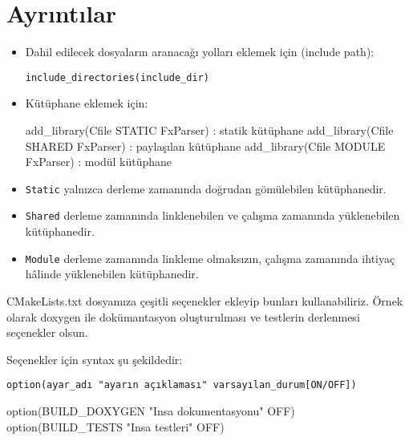 \documentclass[
]{book}
\newenvironment{Shaded}{\begin{snugshade}}{\end{snugshade}}
\newcommand{\ExtensionTok}[1]{#1}
\newcommand{\NormalTok}[1]{#1}
\newcommand{\StringTok}[1]{\textcolor[rgb]{0.31,0.60,0.02}{#1}}
\begin{document}
\hypertarget{ayrux131ntux131lar-1}{%
\section*{Ayrıntılar}\label{ayrux131ntux131lar-1}}

\begin{itemize}
\item
  Dahil edilecek dosyaların aranacağı yolları eklemek için (include path):

\begin{verbatim}
include_directories(include_dir)
\end{verbatim}
\item
  Kütüphane eklemek için:

\begin{Shaded}
\begin{Highlighting}[]
\NormalTok{   add\_library(Cfile STATIC FxParser) : statik kütüphane}
\NormalTok{   add\_library(Cfile SHARED FxParser) : paylaşılan kütüphane}
\NormalTok{   add\_library(Cfile MODULE FxParser) : modül kütüphane }
\end{Highlighting}
\end{Shaded}
\item
  \texttt{Static} yalnızca derleme zamanında doğrudan gömülebilen kütüphanedir.
\item
  \texttt{Shared} derleme zamanında linklenebilen ve çalışma zamanında yüklenebilen kütüphanedir.
\item
  \texttt{Module} derleme zamanında linkleme olmaksızın, çalışma zamanında ihtiyaç hâlinde yüklenebilen kütüphanedir.
\end{itemize}

CMakeLists.txt dosyamıza çeşitli seçenekler ekleyip bunları kullanabiliriz. Örnek olarak doxygen ile dokümantasyon oluşturulması ve testlerin derlenmesi seçenekler olsun.

Seçenekler için syntax şu şekildedir:

\begin{verbatim}
option(ayar_adı "ayarın açıklaması" varsayılan_durum[ON/OFF])
\end{verbatim}

\begin{Shaded}
\begin{Highlighting}[]
   \ExtensionTok{option}\NormalTok{(BUILD\_DOXYGEN }\StringTok{"Insa dokumentasyonu"}\NormalTok{ OFF)}
   \ExtensionTok{option}\NormalTok{(BUILD\_TESTS }\StringTok{"Insa testleri"}\NormalTok{ OFF)}
\end{Highlighting}
\end{Shaded}
\end{document}
